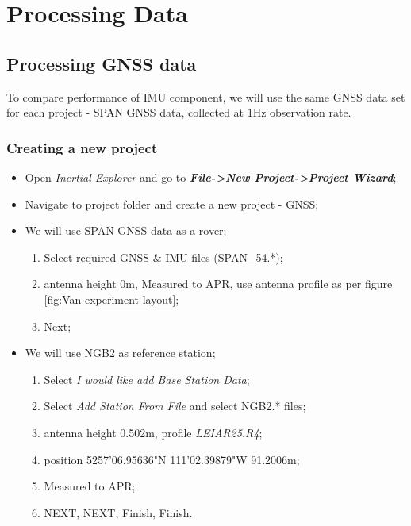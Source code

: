 \documentclass[11pt,fleqn]{book} %
\begin{document}
\vspace{2cm}

\part{Processing Data}

\chapter{Processing GNSS data}\label{sec:Processing-GNSS-data}


To compare performance of IMU component, we will use the same GNSS data set for each project - SPAN GNSS data, collected at 1Hz observation rate.

\section{Creating a new project}\label{sec:Create-an-new}

\begin{itemize}
	\item Open \emph{Inertial Explorer} and go to \textbf{\emph{File->New Project->Project Wizard}};
	\item Navigate to project folder and create a new project - GNSS;
	\item We will use SPAN GNSS data as a rover;
	\begin{enumerate}
		\item Select required GNSS \& IMU files (SPAN\_54.{*});
		\item antenna height 0m, Measured to APR, use antenna profile as per figure \ref{fig:Van-experiment-layout};
		\item Next;
	\end{enumerate}
	\item We will use NGB2 as reference station;
	\begin{enumerate}
		\item Select \textit{I would like add Base Station Data};
		\item Select \textit{Add Station From File} and select NGB2.{*} files;
		\item antenna height 0.502m, profile \emph{LEIAR25.R4};
		\item position 52\textdegree{}57'06.95636"N  1\textdegree{}11'02.39879"W  91.2006m;
		\item Measured to APR;
		\item NEXT, NEXT, Finish, Finish.
	\end{enumerate}
\end{itemize}
\end{document}
